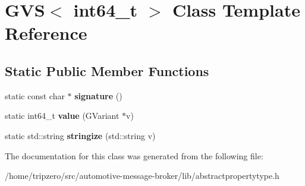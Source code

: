 \hypertarget{classGVS_3_01int64__t_01_4}{\section{G\-V\-S$<$ int64\-\_\-t $>$ Class Template Reference}
\label{classGVS_3_01int64__t_01_4}
}
\subsection*{Static Public Member Functions}
\begin{DoxyCompactItemize}
\item 
\hypertarget{classGVS_3_01int64__t_01_4_a1dc54b2dda69355ec6c037fe0ee28a68}{static const char $\ast$ {\bfseries signature} ()}\label{classGVS_3_01int64__t_01_4_a1dc54b2dda69355ec6c037fe0ee28a68}

\item 
\hypertarget{classGVS_3_01int64__t_01_4_a08ab99b0ab505b2d29e4e954e91f75e0}{static int64\-\_\-t {\bfseries value} (G\-Variant $\ast$v)}\label{classGVS_3_01int64__t_01_4_a08ab99b0ab505b2d29e4e954e91f75e0}

\item 
\hypertarget{classGVS_3_01int64__t_01_4_a66197d92e5c517a97326ccff42e338bb}{static std\-::string {\bfseries stringize} (std\-::string v)}\label{classGVS_3_01int64__t_01_4_a66197d92e5c517a97326ccff42e338bb}

\end{DoxyCompactItemize}


The documentation for this class was generated from the following file\-:\begin{DoxyCompactItemize}
\item 
/home/tripzero/src/automotive-\/message-\/broker/lib/abstractpropertytype.\-h\end{DoxyCompactItemize}
